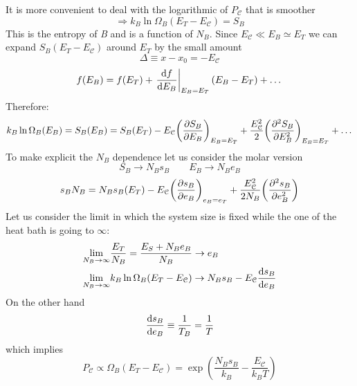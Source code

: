 \documentclass[../main/main.tex]{subfiles}
\begin{document}
It is more convenient to deal with the logarithmic of \( P_{\mathcal{C} } \) that is smoother
\begin{equation}
  \Rightarrow k_B \ln{\Omega _B (E_T - E_{\mathcal{C} })} = S_B
\end{equation}
This is the entropy of \emph{B} and is a function of \( N_B \). Since \( E_{\mathcal{C}} \ll E_B \simeq E_T \) we can expand \( S_B (E_T - E_{\mathcal{C} }) \) around \( E_T \) by the small amount
\begin{equation*}
  \Delta \equiv x-x_0 = - E_{\mathcal{C} }
\end{equation*}
\begin{equation*}
  f(E_B) = f(E_T) +  \eval{\dv{f}{E_B}}_{E_B = E_T} (E_B-E_T) + \dots
\end{equation*}
Therefore:
\begin{equation}
  k_B \ln{\Omega _B (E_B) } = S_B (E_B) = S_B (E_T) - E_{\mathcal{C} } \qty(\pdv{S_B}{E_B} )_{E_B = E_T} + \frac{E^2_{\mathcal{C} }}{2} \qty( \pdv[2]{S_B}{E_B} )_{E_B =E_T} + \dots
\end{equation}
To make explicit the \( N_B \) dependence let us consider the molar version
\begin{equation*}
  S_B \rightarrow N_B s_B \qquad
  E_B \rightarrow N_B e_B
\end{equation*}
\begin{equation}
  s_B N_B = N_B s_B (E_T) - E_{\mathcal{C}} \qty(\pdv{s_B}{e_B} )_{e_B=e_T} + \frac{E_{\mathcal{C}}^2}{2 N_B}  \qty(\pdv[2]{s_B}{e_B} )
\end{equation}
Let us consider the limit in which the system size is fixed while the one of the heat bath is going to \( \infty  \):
\begin{subequations}
\begin{align}
  \lim_{N_B \rightarrow \infty } & \frac{E_T}{N_B} = \frac{E_S+N_B e_B}{N_B} \rightarrow e_B \\
  \lim_{N_B \rightarrow \infty } & k_B \ln{\Omega _B (E_T - E_{\mathcal{C}})} \rightarrow N_B s_B - E_{\mathcal{C}} \dv{s_B}{e_B}
\end{align}
\end{subequations}
On the other hand
\begin{equation}
  \dv{s_B}{e_B} \equiv \frac{1}{T_B} = \frac{1}{T}
\end{equation}
which implies
\begin{equation}
  P_{\mathcal{C}} \propto \Omega _B (E_T - E_{\mathcal{C}}) = \exp (\frac{N_B s_B}{k_B}- \frac{E_{\mathcal{C}}}{k_B T})
\end{equation}
\end{document}
